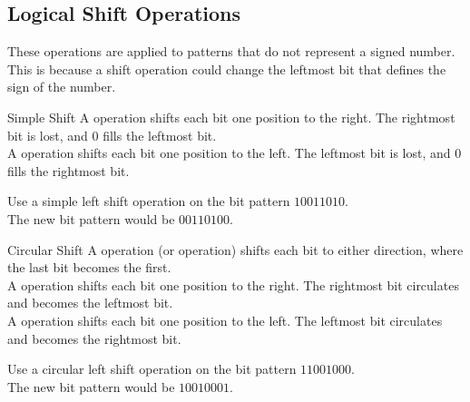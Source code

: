 \documentclass[\main/notes.tex]{subfiles}
\begin{document}
			\subsection{Logical Shift Operations}
				These operations are applied to patterns that do not represent a signed number. This is because a shift operation could change the leftmost bit that defines the sign of the number.
				\begin{definition}{Simple Shift}
					A  operation shifts each bit one position to the right. The rightmost bit is lost, and $0$ fills the leftmost bit.\\[12pt]
					A  operation shifts each bit one position to the left. The leftmost bit is lost, and $0$ fills the rightmost bit.
					\begin{example}
						Use a simple left shift operation on the bit pattern $10011010$.\\
						The new bit pattern would be $00110100$.
					\end{example}
				\end{definition}
				\begin{definition}{Circular Shift}
					A  operation (or  operation) shifts each bit to either direction, where the last bit becomes the first.\\[12pt]
					A  operation shifts each bit one position to the right. The rightmost bit circulates and becomes the leftmost bit.\\[12pt]
					A  operation shifts each bit one position to the left. The leftmost bit circulates and becomes the rightmost bit.
					\begin{example}
						Use a circular left shift operation on the bit pattern $11001000$.\\
						The new bit pattern would be $10010001$.
					\end{example}
				\end{definition}
			\pagebreak
\end{document}
